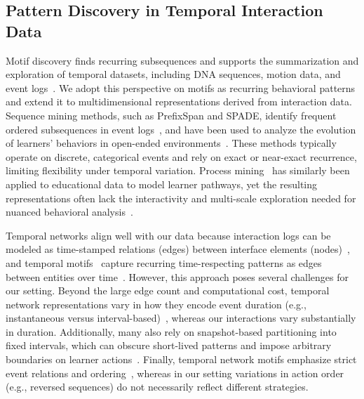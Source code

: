 \documentclass[letterpaper,journal]{IEEEtran}
\begin{document}
\subsection{Pattern Discovery in Temporal Interaction Data}

Motif discovery finds recurring subsequences and supports the summarization and exploration of temporal datasets, including DNA sequences, motion data, and event logs~\cite{lin2002finding, liu2005locating, keogh2005clustering, fu2011review, baker2016educational, guerrini2025time}.
We adopt this perspective on motifs as recurring behavioral patterns and extend it to multidimensional representations derived from interaction data.
Sequence mining methods, such as PrefixSpan and SPADE, identify frequent ordered subsequences in event logs~\cite{pei2001prefixspan, zaki2001spade}, and have been used to analyze the evolution of learners' behaviors in open-ended environments~\cite{kinnebrew2014analyzing, zhang2023sequential, verstege2024using}.
These methods typically operate on discrete, categorical events and rely on exact or near-exact recurrence, limiting flexibility under temporal variation.
Process mining~\cite{romero2010handbook} has similarly been applied to educational data to model learner pathways, yet the resulting representations often lack the interactivity and multi-scale exploration needed for nuanced behavioral analysis~\cite{juhanak2019using, yu2026visual}.

Temporal networks align well with our data because interaction logs can be modeled as time-stamped relations (edges) between interface elements (nodes)~\cite{moody2005dynamic}, and temporal motifs~\cite{kovanen2011temporal, kovanen2013temporal} capture recurring time-respecting patterns as edges between entities over time~\cite{paranjape2017motifs, chen2025discovery}.
However, this approach poses several challenges for our setting.
Beyond the large edge count and computational cost, temporal network representations vary in how they encode event duration (e.g., instantaneous versus interval-based)~\cite{saryce2025powerful}, whereas our interactions vary substantially in duration.
Additionally, many also rely on snapshot-based partitioning into fixed intervals, which can obscure short-lived patterns and impose arbitrary boundaries on learner actions~\cite{liu2023temporal}.
Finally, temporal network motifs emphasize strict event relations and ordering~\cite{paranjape2017motifs}, whereas in our setting variations in action order (e.g., reversed sequences) do not necessarily reflect different strategies.
\end{document}
